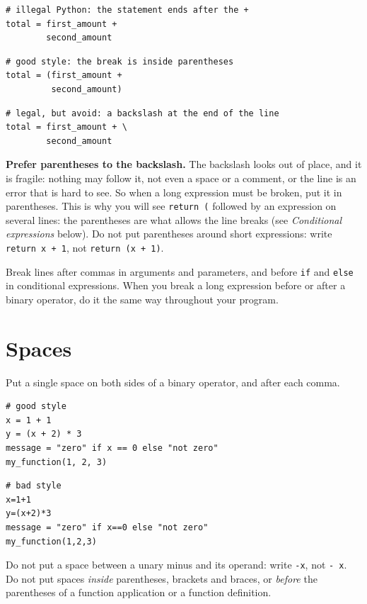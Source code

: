 \begin{lstlisting}
# illegal Python: the statement ends after the +
total = first_amount +
        second_amount
\end{lstlisting}

\begin{lstlisting}
# good style: the break is inside parentheses
total = (first_amount +
         second_amount)
\end{lstlisting}

\begin{lstlisting}
# legal, but avoid: a backslash at the end of the line
total = first_amount + \
        second_amount
\end{lstlisting}

\textbf{Prefer parentheses to the backslash.} The backslash looks out of place, and it is
fragile: nothing may follow it, not even a space or a comment, or the line is an error that is
hard to see. So when a long expression must be broken, put it in parentheses. This is why you will
see \lstinline{return (} followed by an expression on several lines: the parentheses are what
allows the line breaks (see \emph{Conditional expressions} below). Do not put parentheses around
short expressions: write \lstinline{return x + 1}, not \lstinline{return (x + 1)}.

Break lines after commas in arguments and parameters, and before \lstinline{if} and
\lstinline{else} in conditional expressions. When you break a long expression before or after a
binary operator, do it the same way throughout your program.

\section*{Spaces}

Put a single space on both sides of a binary operator, and after each comma.

\begin{lstlisting}
# good style
x = 1 + 1
y = (x + 2) * 3
message = "zero" if x == 0 else "not zero"
my_function(1, 2, 3)
\end{lstlisting}

\begin{lstlisting}
# bad style
x=1+1
y=(x+2)*3
message = "zero" if x==0 else "not zero"
my_function(1,2,3)
\end{lstlisting}

Do not put a space between a unary minus and its operand: write \lstinline{-x}, not
\lstinline{- x}.
Do not put spaces \emph{inside} parentheses, brackets and braces, or \emph{before} the parentheses
of a function application or a function definition.

